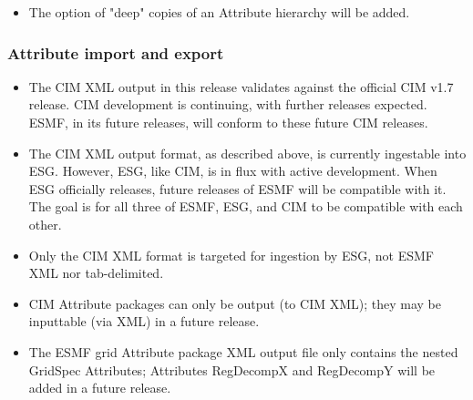 \begin{itemize}
\item The option of "deep" copies of an Attribute hierarchy will be added.
\end{itemize}


\subsubsection{Attribute import and export}
\begin{itemize}
\item The CIM XML output in this release validates against the official CIM v1.7 release.  CIM development is continuing, with further releases expected.  ESMF, in its future releases, will conform to these future CIM releases.
\item The CIM XML output format, as described above, is currently ingestable into ESG. However, ESG, like CIM, is in flux with active development.  When ESG officially releases, future releases of ESMF will be compatible with it.  The goal is for all three of ESMF, ESG, and CIM to be compatible with each other.
\item Only the CIM XML format is targeted for ingestion by ESG, not ESMF XML nor tab-delimited.
\item CIM Attribute packages can only be output (to CIM XML); they may be inputtable (via XML) in a future release.
\item The ESMF grid Attribute package XML output file only contains the nested GridSpec Attributes; Attributes RegDecompX and RegDecompY will be added in a future release. 
\end{itemize}
